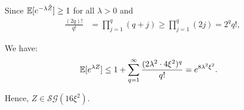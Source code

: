 \begin{proof*}
\begin{enumerate}[label=(\roman*)]
	    \noindent Since $\mathbb{E}[e^{-\lambda \tilde Z}]\ge 1$ for all $\lambda>0$ and 
	    \begin{align*}
	        \frac{(2q)!}{q!} &= \prod_{j=1}^q (q+j) \ge \prod_{j=1}^q (2j) = 2^qq!,
	    \end{align*}

	    \noindent We have:
	    \begin{align*}
	        \mathbb{E}[e^{\lambda Z}] &\le 1 + \sum_{q=1}^\infty \frac{(2\lambda^2\cdot 4\xi^2)^q}{q!} = e^{8\lambda^2\xi^2}.
	    \end{align*}

	    \noindent Hence, $Z\in\mathcal{SG}(16\xi^2)$.
	\end{enumerate}	 
\end{proof*} 
